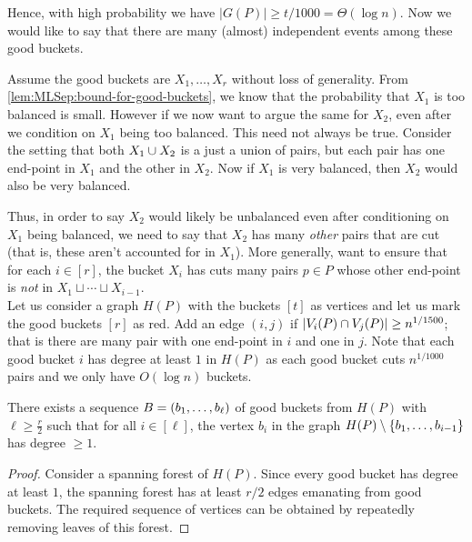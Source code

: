 Hence, with high probability we have $|G(P)| \geq t/1000 = \Theta(\log n)$.
Now we would like to say that there are many (almost) independent events among these good buckets.

Assume the good buckets are $X_1,\ldots,X_{r}$ without loss of generality.
From \autoref{lem:MLSep:bound-for-good-buckets}, we know that the probability that $X_1$ is too balanced is small.
However if we now want to argue the same for $X_2$, even after we condition on $X_1$ being too balanced.
This need not always be true.
Consider the setting that both $X_1 \cup X_2$ is a just a union of pairs, but each pair has one end-point in $X_1$ and the other in $X_2$.
Now if $X_1$ is very balanced, then $X_2$ would also be very balanced.

Thus, in order to say $X_2$ would likely be unbalanced even after conditioning on $X_1$ being balanced, we need to say that $X_2$ has many \emph{other} pairs that are cut (that is, these aren't accounted for in $X_1$).
More generally, want to ensure that for each $i \in [r]$, the bucket $X_i$ has cuts many pairs $p \in P$ whose other end-point is \emph{not} in $X_1 \sqcup \cdots \sqcup X_{i-1}$.\\

Let us consider a graph $H(P)$ with the buckets $[t]$ as vertices and let us mark the good buckets $[r]$ as red.
Add an edge $(i,j)$ if $\left|V_i(P) \cap V_j(P)\right| \geq n^{1/1500}$; that is there are many pair with one end-point in $i$ and one in $j$.
Note that each good bucket $i$ has degree at least $1$ in $H(P)$ as each good bucket cuts $n^{1/1000}$ pairs and we only have $O(\log n)$ buckets.

\begin{lemma}
\label{lem:halfVerticesIndep}
There exists a sequence $B=\left(b_1,\ldots,b_\ell\right)$ of good buckets from $H(P)$ with  $\ell \geq \frac{r}{2}$ such that for all $i \in [\ell]$, the vertex $b_i$ in the graph $H(P) \setminus \left\{b_1,\ldots, b_{i-1}\right\}$ has degree $\geq 1$.
\end{lemma}
\begin{proof}
  Consider a spanning forest of $H(P)$.
Since every good bucket has degree at least $1$, the spanning forest has at least $r/2$ edges emanating from good buckets.
The required sequence of vertices can be obtained by repeatedly removing leaves of this forest.
\end{proof}

